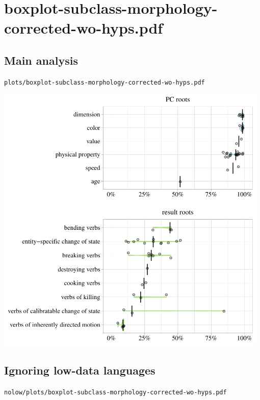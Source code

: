 \eject

\section{boxplot-subclass-morphology-corrected-wo-hyps.pdf}

\subsection{Main analysis}

\texttt{plots/boxplot-subclass-morphology-corrected-wo-hyps.pdf}

\includegraphics[width=0.98\textwidth]{../plots/boxplot-subclass-morphology-corrected-wo-hyps.pdf}

\subsection{Ignoring low-data languages}

\texttt{nolow/plots/boxplot-subclass-morphology-corrected-wo-hyps.pdf}

